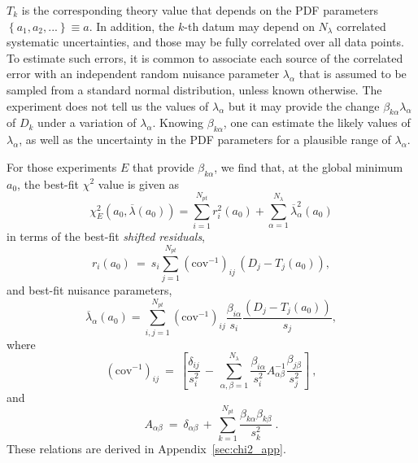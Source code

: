 $T_{k}$ is the corresponding theory value that depends on the PDF
parameters $\left\{a_1,a_2,...\right\}\equiv a$. In addition, the $k$-th datum may depend on
$N_{\lambda}$ correlated systematic uncertainties, and those may
be fully correlated over all data points. To estimate such errors,
it is common to associate each source of the correlated error with
an independent random nuisance parameter $\lambda_{\alpha}$ that is assumed to
be sampled from a standard normal distribution, unless known
otherwise. The experiment does not tell us the values of
$\lambda_{\alpha}$
but it may provide
the change $\beta_{k\alpha}\lambda_\alpha$ of $D_k$ under a variation of $\lambda_{\alpha}$. Knowing $\beta_{k\alpha}$,
one can estimate the likely values of $\lambda_{\alpha}$, as well
as the uncertainty in the PDF parameters for a plausible range of
$\lambda_{\alpha}$.


For those experiments $E$ that provide
$\beta_{k\alpha}$, we find that, at the global minimum $a_0$,
the best-fit $\chi^2$ value is given as
\begin{equation}
\chi^{2}_E (a_{0},\overline \lambda(a_0))=
\sum_{i=1}^{N_{pt}} r_i^2(a_0)
+\sum_{\alpha=1}^{N_\lambda}\overline\lambda^2_\alpha(a_0) \label{Chi2a0l0}
\end{equation}
in terms of the best-fit {\it shifted residuals},
%
\begin{equation}
  r_{i}(a_0)\  =\ s_{i}\sum_{j=1}^{N_{\mathit{pt}}}(\mathrm{cov}^{-1})_{ij}\,\left(D_{j}-T_{j}(a_0)\right),\label{eq:res-cov}
\end{equation}
and best-fit nuisance parameters,
\begin{equation}
\overline{\lambda}_{\alpha}(a_0) =\sum_{i,j=1}^{N_{\mathit{pt}}}(\mathrm{cov}^{-1})_{ij}\frac{\beta_{i\alpha}}{s_{i}}\frac{\left(D_{j}-T_{j}(a_0)\right)}{s_{j}},
\label{eq:lam-cov}
\end{equation}
%
where
%
\begin{equation}
(\mathrm{cov}^{-1})_{ij}\ =\ \left[\frac{\delta_{ij}}{s_{i}^{2}}\,-\,\sum_{\alpha,\beta=1}^{N_{\lambda}}\frac{\beta_{i\alpha}}{s_{i}^{2}}A_{\alpha\beta}^{-1}\frac{\beta_{j\beta}}{s_{j}^{2}}\right]\ ,\label{eq:covmat}
\end{equation}
%
and
%
\begin{equation}
A_{\alpha\beta}\ =\ \delta_{\alpha\beta}\,+\,\sum_{k=1}^{N_{\mathit{pt}}}\frac{\beta_{k\alpha}\beta_{k\beta}}{s_{k}^{2}}\ .
\end{equation}
These relations are derived in Appendix~\ref{sec:chi2_app}.

